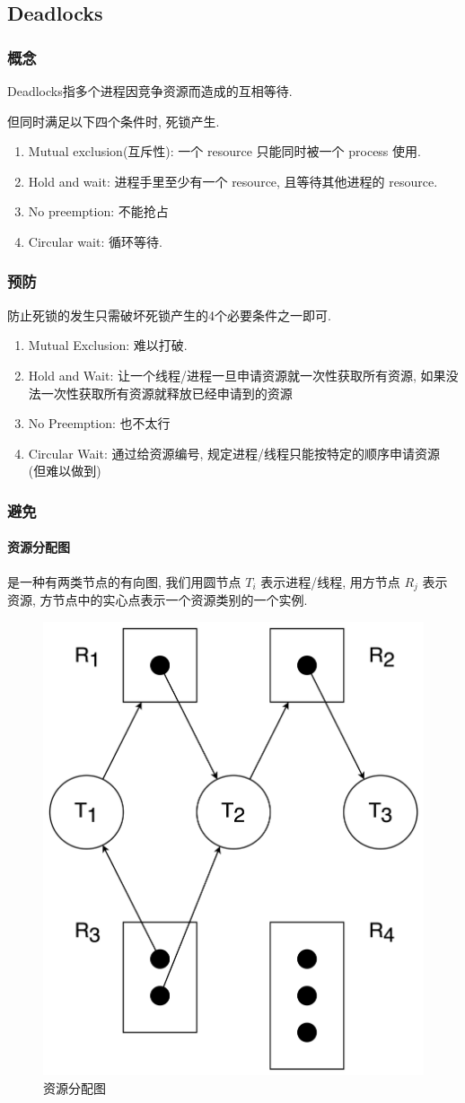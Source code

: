 \subsection{Deadlocks}
\subsubsection{概念}
Deadlocks指多个进程因竞争资源而造成的互相等待. 


但同时满足以下四个条件时, 死锁产生. 
\begin{enumerate}
    \item Mutual exclusion(互斥性): 一个 resource 只能同时被一个 process 使用. 
    \item Hold and wait: 进程手里至少有一个 resource, 且等待其他进程的 resource. 
    \item No preemption: 不能抢占
    \item Circular wait: 循环等待. 
\end{enumerate}

\subsubsection{预防}
防止死锁的发生只需破坏死锁产生的4个必要条件之一即可. 
\begin{enumerate}
    \item Mutual Exclusion: 难以打破. 
    \item Hold and Wait: 让一个线程/进程一旦申请资源就一次性获取所有资源, 如果没法一次性获取所有资源就释放已经申请到的资源
    \item No Preemption: 也不太行
    \item Circular Wait: 通过给资源编号, 规定进程/线程只能按特定的顺序申请资源 (但难以做到)
\end{enumerate}
\subsubsection{避免}
\paragraph{资源分配图}是一种有两类节点的有向图, 我们用圆节点 $T_i$ 表示进程/线程, 用方节点 $R_j$ 表示资源, 方节点中的实心点表示一个资源类别的一个实例. 

\begin{figure}[H]
    \centering
    \includegraphics[width=0.22\linewidth]{pic/OS-CheatSheet/资源分配图}
    \caption{资源分配图}
\end{figure}

